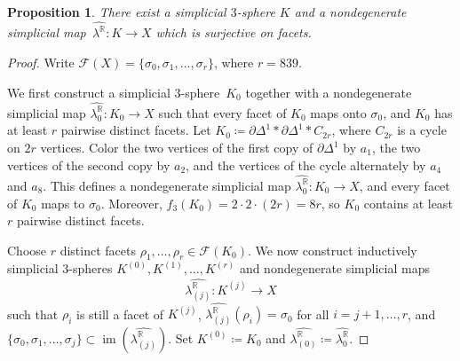 \documentclass{amsart}
\newcommand{\R}{\mathbb{R}}
\newcommand{\cF}{\mathcal{F}}
\newtheorem{proposition}[theorem]{Proposition}
\theoremstyle{definition}
\theoremstyle{remark}
\begin{document}
\begin{proposition}\label{prop:surjective-image} 
    There exist a simplicial $3$-sphere $K$ and a nondegenerate simplicial map~$\widehat{\lambda^{\R}}\colon K\to X$ which is surjective on facets. 
\end{proposition} 
\begin{proof} 
    Write $\cF(X)=\{\sigma_0,\sigma_1,\dots,\sigma_r\}$, where $r=839$.
    
    We first construct a simplicial $3$-sphere~$K_0$ together with a nondegenerate simplicial map $\widehat{\lambda^{\R}_0}\colon K_0\to X$ such that every facet of $K_0$ maps onto $\sigma_0$, and $K_0$ has at least $r$ pairwise distinct facets. 
    Let $K_0\coloneq\partial\Delta^1 \ast \partial\Delta^1 \ast C_{2r}$, where $C_{2r}$ is a cycle on $2r$ vertices.
    Color the two vertices of the first copy of $\partial\Delta^1$ by $a_1$, the two vertices of the second copy by $a_2$, and the vertices of the cycle alternately by $a_4$ and $a_8$. 
    This defines a nondegenerate simplicial map $\widehat{\lambda^{\R}_0}\colon K_0\to X$, and every facet of $K_0$ maps to $\sigma_0$. 
    Moreover, $f_3(K_0)=2\cdot 2\cdot (2r)=8r$, so $K_0$ contains at least $r$ pairwise distinct facets. 
    
    Choose $r$ distinct facets $\rho_1,\dots,\rho_r\in \cF(K_0)$.
    We now construct inductively simplicial $3$-spheres $K^{(0)},K^{(1)},\dots,K^{(r)}$ and nondegenerate simplicial maps 
    $$
        \widehat{\lambda^{\R}_{(j)}}\colon K^{(j)}\to X
    $$ 
    such that $\rho_i$ is still a facet of $K^{(j)}$, $\widehat{\lambda^{\R}_{(j)}}(\rho_i) = \sigma_0$ for all $i = j+1, \dots, r$, and $\{\sigma_0,\sigma_1,\dots,\sigma_j\}\subset \operatorname{im}(\widehat{\lambda^{\R}_{(j)}})$.
    Set $K^{(0)}\coloneq K_0$ and $\widehat{\lambda^{\R}_{(0)}} \coloneq \widehat{\lambda^{\R}_0}$.
    

\end{proof}
\end{document}
